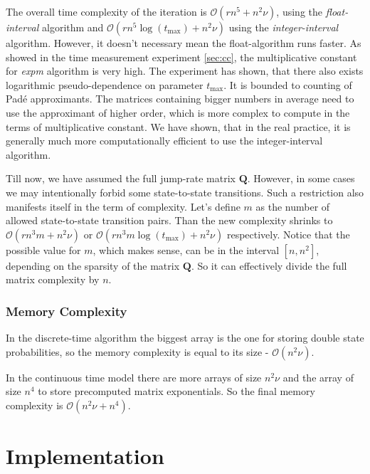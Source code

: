 \documentclass[thesis=M,english]{FITthesis}[2012/10/20]
\newcommand{\matr}[1]{\mathbf{#1}}
\begin{document}
\begin{itemize}
\begin{itemize}
\end{itemize}   

The overall time complexity of the iteration is $\mathcal{O}( r n^5 + n^2\nu )$, using the \textit{float-interval} algorithm and $\mathcal{O}( r n^5\log(t_{\max}) + n^2\nu )$ using the \textit{integer-interval} algorithm. However, it doesn't necessary mean the float-algorithm runs faster. As showed in the time measurement experiment \ref{sec:cc}, the multiplicative constant for \textit{expm} algorithm is very high. The experiment has shown, that there also exists logarithmic pseudo-dependence on parameter $t_{\max}$. It is bounded to counting of Pad\'{e} approximants. The matrices containing bigger numbers in average need to use the approximant of higher order, which is more complex to compute in the terms of multiplicative constant. We have shown, that in the real practice, it is generally much more computationally efficient to use the integer-interval algorithm.

Till now, we have assumed the full jump-rate matrix $\matr{Q}$. However, in some cases we may intentionally forbid some state-to-state transitions. Such a restriction also manifests itself in the term of complexity. Let's define $m$ as the number of allowed state-to-state transition pairs. Than the new complexity shrinks to $\mathcal{O}( r n^3 m + n^2\nu )$ or $\mathcal{O}( r n^3 m \log(t_{\max}) + n^2\nu )$ respectively. Notice that the possible value for $m$, which makes sense, can be in the interval $[n,n^2]$, depending on the sparsity of the matrix $\matr{Q}$. So it can effectively divide the full matrix complexity by $n$.  

\end{itemize}

\subsection{Memory Complexity}
In the discrete-time algorithm the biggest array is the one for storing double state probabilities, so the memory complexity is equal to its size - $\mathcal{O}(n^2\nu)$. 

In the continuous time model there are more arrays of size $n^2\nu$ and the array of size $n^4$ to store precomputed matrix exponentials. So the final memory complexity is $\mathcal{O}( n^2\nu + n^4 )$.

\chapter{Implementation}\label{ch:i}
\end{document}
